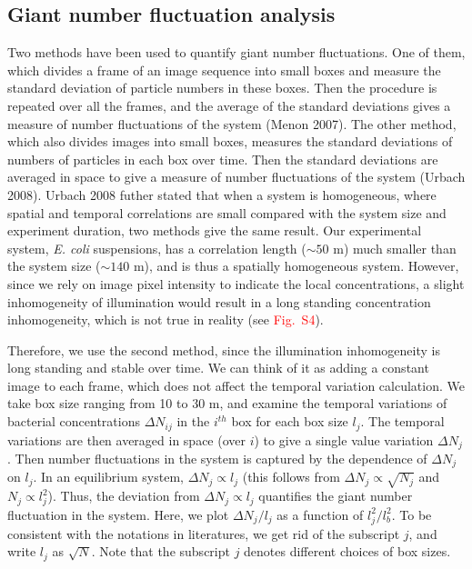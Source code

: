 \documentclass[twocolumn,aps,pre,amsmath,amssymb,floatfix,longbibliography]{revtex4-1}
\begin{document}
\subsection{Giant number fluctuation analysis}\label{sec:method_gnf}
Two methods have been used to quantify giant number fluctuations. One of them, which divides a frame of an image sequence into small boxes and measure the standard deviation of particle numbers in these boxes. Then the procedure is repeated over all the frames, and the average of the standard deviations gives a measure of number fluctuations of the system (Menon 2007). The other method, which also divides images into small boxes, measures the standard deviations of numbers of particles in each box over time. Then the standard deviations are averaged in space to give a measure of number fluctuations of the system (Urbach 2008). Urbach 2008 futher stated that when a system is homogeneous, where spatial and temporal correlations are small compared with the system size and experiment duration, two methods give the same result. Our experimental system, \textit{E. coli} suspensions, has a correlation length ($\sim 50$ \textmu m) much smaller than the system size ($\sim 140$ \textmu m), and is thus a spatially homogeneous system. However, since we rely on image pixel intensity to indicate the local concentrations, a slight inhomogeneity of illumination would result in a long standing concentration inhomogeneity, which is not true in reality (see \textcolor{red}{Fig.~S4}).

Therefore, we use the second method, since the illumination inhomogeneity is long standing and stable over time. We can think of it as adding a constant image to each frame, which does not affect the temporal variation calculation. We take box size ranging from 10 to 30 \textmu m, and examine the temporal variations of bacterial concentrations $\Delta N_{ij}$ in the $i^{th}$ box for each box size $l_j$. The temporal variations are then averaged in space (over $i$) to give a single value variation $\Delta N_{j}$. Then number fluctuations in the system is captured by the dependence of $\Delta N_{j}$ on $l_j$. In an equilibrium system, $\Delta N_{j}\propto l_j$ (this follows from $\Delta N_{j}\propto \sqrt{N_j}$ and $N_j\propto l_j^2$). Thus, the deviation from $\Delta N_{j}\propto l_j$ quantifies the giant number fluctuation in the system. Here, we plot $\Delta N_{j}/l_j$ as a function of $l_j^2/l_b^2$. To be consistent with the notations in literatures, we get rid of the subscript $j$, and write $l_j$ as $\sqrt{N}$. Note that the subscript $j$ denotes different choices of box sizes.
\end{document}
